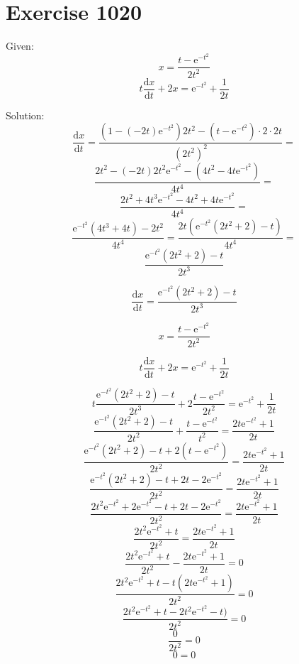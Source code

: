 \documentclass[a4paper, 10pt]{scrartcl}
\newcommand*\deriv{\mathrm{d}}
\newcommand*\euler{\mathrm{e}}
\begin{document}
\section{Exercise 1020}

Given:
\[
x = \frac{t - \euler^{-t^{2}}}{2t^{2}}
\]
\[
t\frac{\deriv x}{\deriv t} + 2x = \euler^{-t^{2}} + \frac{1}{2t}
\]

Solution:
\[
\frac{\deriv x}{\deriv t} = \frac{(1 - (-2t)\euler^{-t^{2}})2t^{2} - (t - \euler^{-t^{2}})\cdot 2\cdot 2t}{(2t^{2})^{2}} =
\]
\[
\frac{2t^{2} - (-2t)2t^{2}\euler^{-t^{2}} - (4t^{2} - 4t\euler^{-t^{2}})}{4t^{4}} =
\]
\[
\frac{2t^{2} + 4t^{3}\euler^{-t^{2}} - 4t^{2} + 4t\euler^{-t^{2}}}{4t^{4}} =
\]
\[
\frac{\euler^{-t^{2}}(4t^{3} + 4t) - 2t^{2}}{4t^{4}} = \frac{2t(\euler^{-t^{2}}(2t^{2} + 2) - t)}{4t^{4}} =
\]
\[
\frac{\euler^{-t^{2}}(2t^{2} + 2) - t}{2t^{3}}
\]

\[
\frac{\deriv x}{\deriv t} = \frac{\euler^{-t^{2}}(2t^{2} + 2) - t}{2t^{3}}
\]

\[
x = \frac{t - \euler^{-t^{2}}}{2t^{2}}
\]

\[
t\frac{\deriv x}{\deriv t} + 2x = \euler^{-t^{2}} + \frac{1}{2t}
\]

\[
t\frac{\euler^{-t^{2}}(2t^{2} + 2) - t}{2t^{3}} + 2\frac{t - \euler^{-t^{2}}}{2t^{2}} = \euler^{-t^{2}} + \frac{1}{2t}
\]
\[
\frac{\euler^{-t^{2}}(2t^{2} + 2) - t}{2t^{2}} + \frac{t - \euler^{-t^{2}}}{t^{2}} = \frac{2t\euler^{-t^{2}} + 1}{2t}
\]
\[
\frac{\euler^{-t^{2}}(2t^{2} + 2) - t + 2(t - \euler^{-t^{2}})}{2t^{2}} = \frac{2t\euler^{-t^{2}} + 1}{2t}
\]
\[
\frac{\euler^{-t^{2}}(2t^{2} + 2) - t + 2t - 2\euler^{-t^{2}}}{2t^{2}} = \frac{2t\euler^{-t^{2}} + 1}{2t}
\]
\[
\frac{2t^{2}\euler^{-t^{2}} + 2\euler^{-t^{2}} - t + 2t - 2\euler^{-t^{2}}}{2t^{2}} = \frac{2t\euler^{-t^{2}} + 1}{2t}
\]
\[
\frac{2t^{2}\euler^{-t^{2}} + t}{2t^{2}} = \frac{2t\euler^{-t^{2}} + 1}{2t}
\]
\[
\frac{2t^{2}\euler^{-t^{2}} + t}{2t^{2}} - \frac{2t\euler^{-t^{2}} + 1}{2t} = 0
\]
\[
\frac{2t^{2}\euler^{-t^{2}} + t - t(2t\euler^{-t^{2}} + 1)}{2t^{2}} = 0
\]
\[
\frac{2t^{2}\euler^{-t^{2}} + t - 2t^{2}\euler^{-t^{2}} - t)}{2t^{2}} = 0
\]
\[
\frac{0}{2t^{2}} = 0
\]
\[
0 = 0
\]
\end{document}
